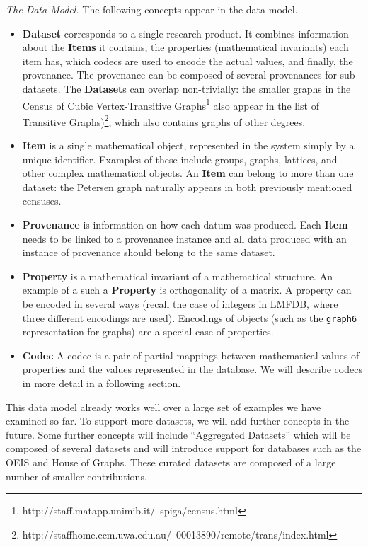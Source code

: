 \medskip

\emph{The \dmh Data Model.} The following concepts appear in the data model.
\begin{itemize}
\item \textbf{Dataset} corresponds to a single research product.
It combines information about the \textbf{Items} it contains,
the properties (mathematical invariants) each item has,
which codecs are used to encode the actual values,
and finally, the provenance.
The provenance can be composed of several provenances for sub-datasets.
The \textbf{Dataset}s can overlap non-trivially: 
the smaller graphs in the Census of Cubic Vertex-Transitive Graphs\footnote{http://staff.matapp.unimib.it/~spiga/census.html}
also appear in the list of Transitive Graphs)\footnote{http://staffhome.ecm.uwa.edu.au/~00013890/remote/trans/index.html},
which also contains graphs of other degrees.

\item \textbf{Item} is a single mathematical object, 
represented in the system simply by a unique identifier.
Examples of these include groups, graphs, lattices, and other complex mathematical objects.
An \textbf{Item} can belong to more than one dataset:
the Petersen graph naturally appears in both previously mentioned censuses.

\item \textbf{Provenance} is information on how each datum was produced.
Each \textbf{Item} needs to be linked to a provenance instance and 
all data produced with an instance of provenance should belong to the same dataset.

\item \textbf{Property} is a mathematical invariant of a mathematical structure.
An example of a such a \textbf{Property} is orthogonality of a matrix.
A property can be encoded in several ways
(recall the case of integers in LMFDB, where three different encodings are used).
Encodings of objects (such as the \texttt{graph6} representation for graphs)
are a special case of properties.

\item \textbf{Codec} A codec is a pair of partial mappings between 
mathematical values of properties and the values represented in the database.
We will describe codecs in more detail in a following section.
\end{itemize}
This data model already works well over a large set of examples we have examined so far.
To support more datasets, we will add further concepts in the future.
Some further concepts will include ``Aggregated Datasets'' which will be composed of several datasets and will
introduce support for databases such as the OEIS and House of Graphs.
These curated datasets are composed of a large number of smaller contributions.

